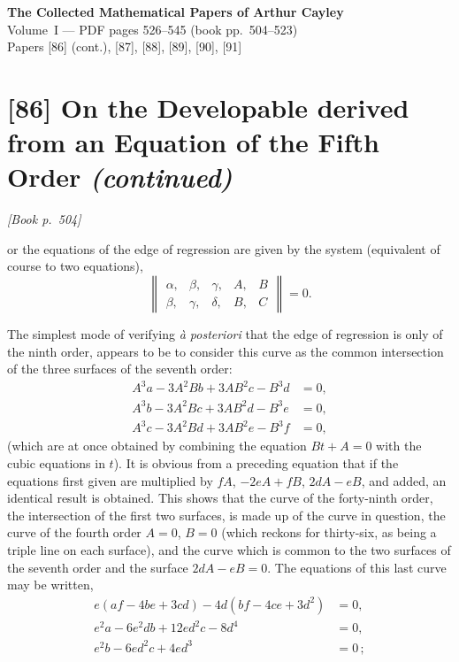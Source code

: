 \documentclass[11pt]{article}
\begin{document}
\begin{center}
{\Large\bfseries The Collected Mathematical Papers of Arthur Cayley}\\[0.4em]
{\large Volume~I --- PDF pages 526--545 (book pp.~504--523)}\\[0.4em]
{\normalsize Papers [86] (cont.), [87], [88], [89], [90], [91]}
\end{center}

\vspace{1em}


\section*{[86] On the Developable derived from an Equation of the Fifth Order \emph{(continued)}}

\noindent\textit{[Book p.~504]}\hfill

\smallskip

\noindent or the equations of the edge of regression are given by the system (equivalent of course to two equations),
\[
\left\| \begin{array}{ccccc} \alpha, & \beta, & \gamma, & A, & B \\ \beta, & \gamma, & \delta, & B, & C \end{array} \right\| = 0.
\]

The simplest mode of verifying \emph{\`a posteriori} that the edge of regression is only of the ninth order, appears to be to consider this curve as the common intersection of the three surfaces of the seventh order:
\[
\begin{aligned}
A^3 a - 3 A^2 B b + 3 A B^2 c - B^3 d &= 0,\\
A^3 b - 3 A^2 B c + 3 A B^2 d - B^3 e &= 0,\\
A^3 c - 3 A^2 B d + 3 A B^2 e - B^3 f &= 0,
\end{aligned}
\]
(which are at once obtained by combining the equation $B t + A = 0$ with the cubic equations in $t$). It is obvious from a preceding equation that if the equations first given are multiplied by $fA$, $-2eA + fB$, $2dA - eB$, and added, an identical result is obtained. This shows that the curve of the forty-ninth order, the intersection of the first two surfaces, is made up of the curve in question, the curve of the fourth order $A=0$, $B=0$ (which reckons for thirty-six, as being a triple line on each surface), and the curve which is common to the two surfaces of the seventh order and the surface $2 dA - eB = 0$. The equations of this last curve may be written,
\[
\begin{aligned}
e(af - 4 be + 3 cd) - 4 d (bf - 4 ce + 3 d^{2}) &= 0,\\
e^{2} a - 6 e^{2} d b + 12 e d^{2} c - 8 d^{4} &= 0,\\
e^{2} b - 6 e d^{2} c + 4 e d^{3} &= 0\,;
\end{aligned}
\]
\end{document}
